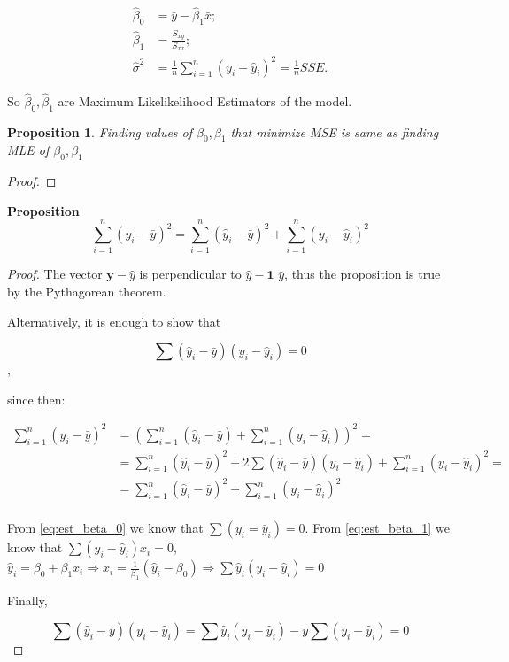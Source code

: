 \documentclass[12pt,a4paper,oneside]{book} %
\newtheorem{proposition}[theorem]{Proposition}
\begin{document}
\begin{align*}
\hat{\beta}_0  &= \bar{y} - \hat{\beta}_1 \bar{x}; \\
\hat{\beta}_1 &= \frac{S_{xy}}{S_{xx}}; \\
\hat{\sigma}^2 &= \frac{1}{n} \sum_{i=1}^{n} (y_i - \hat{y}_i)^2 = \frac{1}{n} SSE.
\end{align*}

So $\hat{\beta}_0, \hat{\beta}_1$ are Maximum Likelikelihood Estimators of the model.

\begin{proposition}
	Finding values of $\beta_0, \beta_1 $ that minimize MSE is same as finding MLE of $\beta_0 ,\beta_1 $
\end{proposition}


\begin{proof}
\end{proof}



\textbf{Proposition}
\[
\sum_{i=1}^{n} (y_i - \bar{y})^2 = \sum_{i=1}^{n} (\hat{y}_i - \bar{y})^2 + \sum_{i=1}^{n} (y_i - \hat{y}_i)^2
\]

\begin{proof}The vector $\textbf{y} - \textbf{$\hat{y}$}$ is perpendicular to $\textbf{$\hat{y}$} - \textbf{1 $\bar{y}$}$, thus the proposition is true by the Pythagorean theorem.

Alternatively, it is enough to show that

\[
	\sum (\hat{y}_i-\bar{y})(y_i-\hat{y}_i) = 0	
\],

since then:

\begin{align*}
	\sum_{i=1}^{n} (y_i - \bar{y})^2 &= (\sum_{i=1}^{n} (\hat{y}_i - \bar{y}) + \sum_{i=1}^{n} (y_i - \hat{y}_i))^2 = \\
	&= \sum_{i=1}^{n} (\hat{y}_i - \bar{y})^2 + 2\sum (\hat{y}_i-\bar{y})(y_i-\hat{y}_i)+ \sum_{i=1}^{n} (y_i - \hat{y}_i)^2 = \\
	&= \sum_{i=1}^{n} (\hat{y}_i - \bar{y})^2 + \sum_{i=1}^{n} (y_i - \hat{y}_i)^2 \\
\end{align*}

From \ref{eq:est_beta_0} we know that $\sum (y_i=\bar{y}_i)=0$.
From \ref{eq:est_beta_1} we know that $\sum (y_i-\hat{y}_i)x_i=0$,
$\hat{y}_i = \beta_0 + \beta_1 x_i \Rightarrow x_i = \frac{1}{\beta_1}(\hat{y}_i-\beta_0) \Rightarrow \sum \hat{y}_i (y_i-\hat{y}_i)=0$

Finally, 

\[
	\sum (\hat{y}_i-\bar{y})(y_i-\hat{y}_i) = \sum \hat{y}_i(y_i-\hat{y}_i)-\bar{y}\sum (y_i-\hat{y}_i)=0	
\]


\end{proof}
\end{document}
